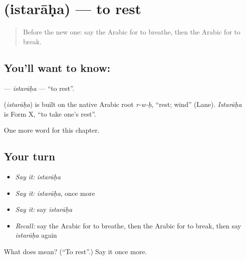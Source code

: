 \section[\texorpdfstring{\ar{استراح} (istarāḥa)}{استراح (istarāḥa)}]{ (istarāḥa) — to rest}

\label{lesson:AR-C161-istaraha}



\begin{quote}
Before the new one: say the Arabic for to breathe, then the Arabic for to break.
\end{quote}

\subsection*{You'll want to know: }
\textbf{} — \emph{istarāḥa} — \textquotedblleft{}to rest\textquotedblright{}.

\begin{cousinweb}
\textbf{} (\emph{istarāḥa}) is built on the native Arabic root \emph{r-w-ḥ}, \textquotedblleft{}rest; wind\textquotedblright{} (Lane). \emph{Istarāḥa} is Form X, \textquotedblleft{}to take one's rest\textquotedblright{}.
\end{cousinweb}

\begin{grammarlens}[title={What you've built}]
One more word for this chapter.
\end{grammarlens}

\subsection*{Your turn}
\begin{itemize}
\raggedright
  \item \emph{Say it:} \emph{istarāḥa}
  \item \emph{Say it:} \emph{istarāḥa}, once more
  \item \emph{Say it:} say \emph{istarāḥa}
  \item \emph{Recall:} say the Arabic for to breathe, then the Arabic for to break, then say \emph{istarāḥa} again
\end{itemize}

\begin{tcolorbox}[breakable,colback=teal!4,colframe=teal!35!black,title={Before you move on}]
What does  mean? (\textquotedblleft{}To rest\textquotedblright{}.) Say it once more.
\end{tcolorbox}
